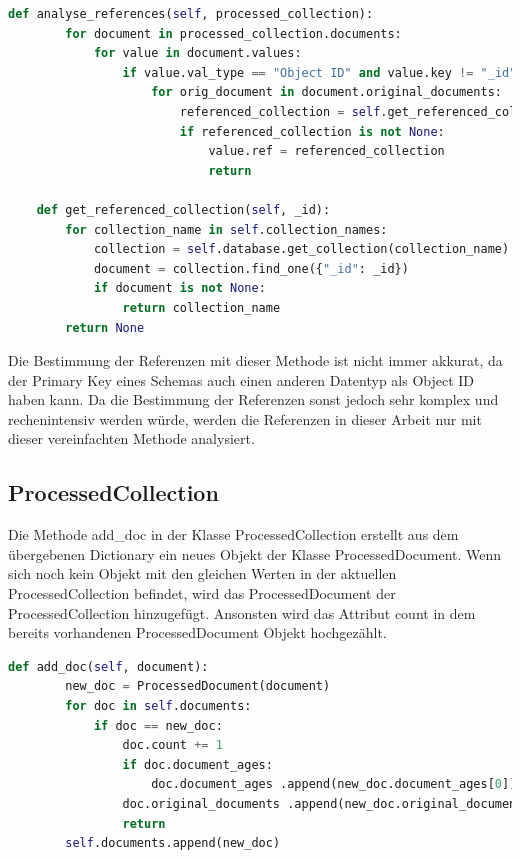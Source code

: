 \begin{lstlisting}[language=python, caption={DatabaseAnalysis.analyse\_references},label={lst:backend_analyse_ref}]
    def analyse_references(self, processed_collection):
        for document in processed_collection.documents:
            for value in document.values:
                if value.val_type == "Object ID" and value.key != "_id":
                    for orig_document in document.original_documents:
                        referenced_collection = self.get_referenced_collection (orig_document.get(value.key))
                        if referenced_collection is not None:
                            value.ref = referenced_collection
                            return

    def get_referenced_collection(self, _id):
        for collection_name in self.collection_names:
            collection = self.database.get_collection(collection_name)
            document = collection.find_one({"_id": _id})
            if document is not None:
                return collection_name
        return None
\end{lstlisting}

Die Bestimmung der Referenzen mit dieser Methode ist nicht immer akkurat, da der Primary Key eines Schemas auch einen anderen Datentyp als Object ID haben kann.
Da die Bestimmung der Referenzen sonst jedoch sehr komplex und rechenintensiv werden würde, werden die Referenzen in dieser Arbeit nur mit dieser vereinfachten Methode analysiert.

\subsection{ProcessedCollection}
\label{sub:ba_processed_collection}

Die Methode add\_doc in der Klasse ProcessedCollection erstellt aus dem übergebenen Dictionary ein neues Objekt der Klasse ProcessedDocument.
Wenn sich noch kein Objekt mit den gleichen Werten in der aktuellen ProcessedCollection befindet, wird das ProcessedDocument der ProcessedCollection hinzugefügt.
Ansonsten wird das Attribut count in dem bereits vorhandenen ProcessedDocument Objekt hochgezählt.


\begin{lstlisting}[language=python, caption={ProcessedCollection.add\_doc},label={lst:backend_add_doc}]
    def add_doc(self, document):
        new_doc = ProcessedDocument(document)
        for doc in self.documents:
            if doc == new_doc:
                doc.count += 1
                if doc.document_ages:
                    doc.document_ages .append(new_doc.document_ages[0])
                doc.original_documents .append(new_doc.original_documents[0])
                return
        self.documents.append(new_doc)
\end{lstlisting}

